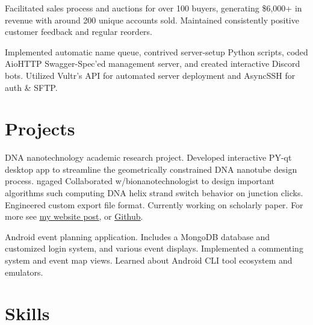 \documentclass[letterpaper, 10pt]{article}
\begin{document}
{Facilitated sales process and auctions for over 100 buyers, generating \$6,000+ in revenue with around 200 unique accounts sold. Maintained consistently positive customer feedback and regular reorders.}

{Implemented automatic name queue, contrived server-setup Python scripts, coded AioHTTP Swagger-Spec'ed management server, and created interactive Discord bots. Utilized Vultr's API for automated server deployment and AsyncSSH for auth \& SFTP.}
\resumeItemListEnd

\resumeSubHeadingListEnd

\section{Projects}
\resumeSubHeadingListStart
{}
{DNA nanotechnology academic research project. Developed interactive PY-qt desktop app to streamline the geometrically constrained DNA nanotube design process. ngaged Collaborated w/bionanotechnologist to design important algorithms such computing DNA helix strand switch behavior on junction clicks. Engineered custom export file format. Currently working on scholarly paper. For more see \href{https://404wolf.com/posts/projects/DNANanotubes}{\ul{my website post}}, or \href{https://github.com/NATuG3/NATuG3}{\ul{Github}}.}

{Android event planning application. Includes a MongoDB database and customized login system, and various event displays. Implemented a commenting system and event map views. Learned about Android CLI tool ecosystem and emulators.}
\resumeSubHeadingListEnd

\section{Skills}
\resumeSubHeadingListStart
{}



\resumeSubHeadingListEnd
\end{document}
